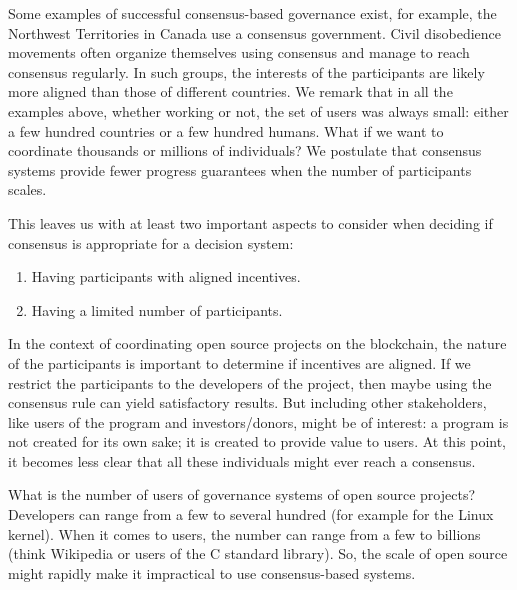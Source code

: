 Some examples of successful consensus-based governance exist, for ex\-ample, the Northwest Territories in Canada use a consensus government.
Civil disobedience movements often organize themselves using consensus and manage to reach consensus regularly.
In such groups, the interests of the participants are likely more aligned than those of different countries.
We remark that in all the examples above, whether working or not, the set of users was always small: either a few hundred countries or a few hundred humans.
What if we want to coordinate thousands or millions of individuals?
We postulate that consensus systems provide fewer progress guarantees when the number of parti\-ci\-pants scales.

This leaves us with at least two important aspects to consider when deciding if consensus is appropriate for a decision system:

\begin{enumerate}
  \item Having participants with aligned incentives.
  \item Having a limited number of participants.
\end{enumerate}

In the context of coordinating open source projects on the blockchain, the nature of the participants is important to determine if incentives are aligned.
If we restrict the participants to the developers of the project, then maybe using the consensus rule can yield satisfactory results.
But including other stakeholders, like users of the program and investors/donors, might be of interest: a program is not created for its own sake; it is created to provide value to users.
At this point, it becomes less clear that all these individuals might ever reach a consensus.

What is the number of users of governance systems of open source projects?
Developers can range from a few to several hundred (for example for the Linux kernel).
When it comes to users, the number can range from a few to billions (think Wikipedia or users of the C standard library).
So, the scale of open source might rapidly make it impractical to use consensus-based systems.
